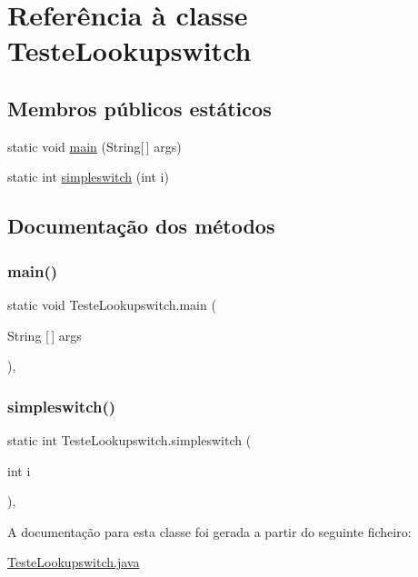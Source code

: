 \hypertarget{class_teste_lookupswitch}{}\section{Referência à classe Teste\+Lookupswitch}
\label{class_teste_lookupswitch}
\subsection*{Membros públicos estáticos}
\begin{DoxyCompactItemize}
\item 
static void \hyperlink{class_teste_lookupswitch_a432ee8eab5419559418e70e9694ce57a}{main} (String\mbox{[}$\,$\mbox{]} args)
\item 
static int \hyperlink{class_teste_lookupswitch_a1f1e50889cc31f545da90a59f5cee1cb}{simpleswitch} (int i)
\end{DoxyCompactItemize}


\subsection{Documentação dos métodos}
\hypertarget{class_teste_lookupswitch_a432ee8eab5419559418e70e9694ce57a}{}\label{class_teste_lookupswitch_a432ee8eab5419559418e70e9694ce57a} 
\subsubsection{\texorpdfstring{main()}{main()}}
{\footnotesize\ttfamily static void Teste\+Lookupswitch.\+main (\begin{DoxyParamCaption}\item[{String \mbox{[}$\,$\mbox{]}}]{args }\end{DoxyParamCaption})\hspace{0.3cm}{\ttfamily [inline]}, {\ttfamily [static]}}

\hypertarget{class_teste_lookupswitch_a1f1e50889cc31f545da90a59f5cee1cb}{}\label{class_teste_lookupswitch_a1f1e50889cc31f545da90a59f5cee1cb} 
\subsubsection{\texorpdfstring{simpleswitch()}{simpleswitch()}}
{\footnotesize\ttfamily static int Teste\+Lookupswitch.\+simpleswitch (\begin{DoxyParamCaption}\item[{int}]{i }\end{DoxyParamCaption})\hspace{0.3cm}{\ttfamily [inline]}, {\ttfamily [static]}}



A documentação para esta classe foi gerada a partir do seguinte ficheiro\+:\begin{DoxyCompactItemize}
\item 
\hyperlink{_teste_lookupswitch_8java}{Teste\+Lookupswitch.\+java}\end{DoxyCompactItemize}
